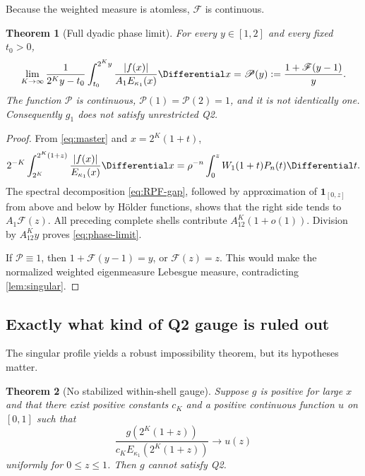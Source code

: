 \documentclass[11pt,oneside]{article}
\newtheorem{theorem}{Theorem}[section]
\theoremstyle{definition}
\theoremstyle{remark}
\begin{document}
Because the weighted measure is atomless, $\mathscr F$ is continuous.

\begin{theorem}[Full dyadic phase limit]
\label{thm:phase}
For every $y\in[1,2]$ and every fixed $t_0>0$,
\begin{equation}
 \lim_{K\to\infty}
 \frac1{2^Ky-t_0}\int_{t_0}^{2^Ky}
 \frac{|f(x)|}{A_1E_{\kappa_1}(x)}\Differential x
 =\mathscr P(y):=\frac{1+\mathscr F(y-1)}{y}.
 \label{eq:phase-limit}
\end{equation}
The function $\mathscr P$ is continuous,
$\mathscr P(1)=\mathscr P(2)=1$, and it is not identically one.
Consequently $g_1$ does not satisfy unrestricted Q2.
\end{theorem}

\begin{proof}
From \eqref{eq:master} and $x=2^K(1+t)$,
\begin{equation}
 2^{-K}\int_{2^K}^{2^K(1+z)}
 \frac{|f(x)|}{E_{\kappa_1}(x)}\Differential x
 =\rho^{-n}\int_0^zW_1(1+t)P_n(t)\Differential t.
 \label{eq:partial-shell}
\end{equation}
The spectral decomposition \eqref{eq:RPF-gap}, followed by approximation of
$\mathbf1_{[0,z]}$ from above and below by H\"older functions, shows that the
right side tends to $A_1\mathscr F(z)$.  All preceding complete shells
contribute $A_12^K(1+o(1))$.  Division by $A_12^Ky$ proves
\eqref{eq:phase-limit}.

If $\mathscr P\equiv1$, then
$1+\mathscr F(y-1)=y$, or $\mathscr F(z)=z$.  This would make the normalized
weighted eigenmeasure Lebesgue measure, contradicting \cref{lem:singular}.
\end{proof}

\subsection{Exactly what kind of Q2 gauge is ruled out}

The singular profile yields a robust impossibility theorem, but its hypotheses
matter.

\begin{theorem}[No stabilized within-shell gauge]
\label{thm:no-stabilized-gauge}
Suppose $g$ is positive for large $x$ and that there exist positive constants
$c_K$ and a positive continuous function $u$ on $[0,1]$ such that
\begin{equation}
 \frac{g(2^K(1+z))}
      {c_KE_{\kappa_1}(2^K(1+z))}
 \longrightarrow u(z)
 \label{eq:stabilized-gauge}
\end{equation}
uniformly for $0\le z\le1$.  Then $g$ cannot satisfy Q2.
\end{theorem}
\end{document}
